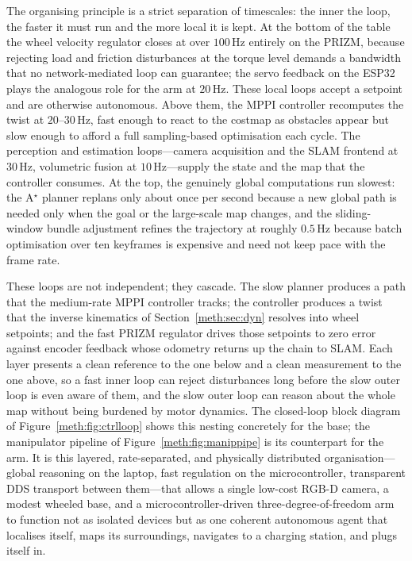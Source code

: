 The organising principle is a strict separation of timescales: the inner the loop, the faster it must run and the more local it is kept. At the bottom of the table the wheel velocity regulator closes at over \ensuremath{100\,\mathrm{Hz}} entirely on the PRIZM, because rejecting load and friction disturbances at the torque level demands a bandwidth that no network-mediated loop can guarantee; the servo feedback on the ESP32 plays the analogous role for the arm at \ensuremath{20\,\mathrm{Hz}}. These local loops accept a setpoint and are otherwise autonomous. Above them, the MPPI controller recomputes the twist at \ensuremath{20\text{--}30\,\mathrm{Hz}}, fast enough to react to the costmap as obstacles appear but slow enough to afford a full sampling-based optimisation each cycle. The perception and estimation loops---camera acquisition and the SLAM frontend at \ensuremath{30\,\mathrm{Hz}}, volumetric fusion at \ensuremath{10\,\mathrm{Hz}}---supply the state and the map that the controller consumes. At the top, the genuinely global computations run slowest: the A$^\star$ planner replans only about once per second because a new global path is needed only when the goal or the large-scale map changes, and the sliding-window bundle adjustment refines the trajectory at roughly \ensuremath{0.5\,\mathrm{Hz}} because batch optimisation over ten keyframes is expensive and need not keep pace with the frame rate.

These loops are not independent; they cascade. The slow planner produces a path that the medium-rate MPPI controller tracks; the controller produces a twist that the inverse kinematics of Section~\ref{meth:sec:dyn} resolves into wheel setpoints; and the fast PRIZM regulator drives those setpoints to zero error against encoder feedback whose odometry returns up the chain to SLAM. Each layer presents a clean reference to the one below and a clean measurement to the one above, so a fast inner loop can reject disturbances long before the slow outer loop is even aware of them, and the slow outer loop can reason about the whole map without being burdened by motor dynamics. The closed-loop block diagram of Figure~\ref{meth:fig:ctrlloop} shows this nesting concretely for the base; the manipulator pipeline of Figure~\ref{meth:fig:manippipe} is its counterpart for the arm. It is this layered, rate-separated, and physically distributed organisation---global reasoning on the laptop, fast regulation on the microcontroller, transparent DDS transport between them---that allows a single low-cost RGB-D camera, a modest wheeled base, and a microcontroller-driven three-degree-of-freedom arm to function not as isolated devices but as one coherent autonomous agent that localises itself, maps its surroundings, navigates to a charging station, and plugs itself in.



\clearpage
\endgroup
